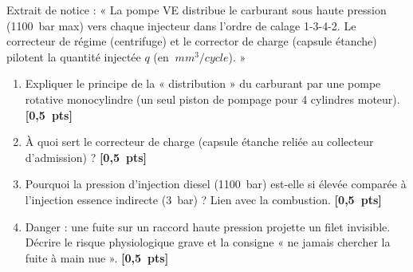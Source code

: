 \documentclass[11pt]{article}
\begin{document}
\begin{exercice}
Extrait de notice : « La pompe VE distribue le carburant sous haute pression (\SI{1100}{bar} max) vers chaque injecteur dans l'ordre de calage 1-3-4-2. Le correcteur de régime (centrifuge) et le corrector de charge (capsule étanche) pilotent la quantité injectée $q$ (en $\SI{}{mm^3/cycle}$). »
\begin{enumerate}
    \item Expliquer le principe de la « distribution » du carburant par une pompe rotative monocylindre (un seul piston de pompage pour 4 cylindres moteur). \hfill\textbf{[0,5~pts]}
    \item À quoi sert le correcteur de charge (capsule étanche reliée au collecteur d'admission) ? \hfill\textbf{[0,5~pts]}
    \item Pourquoi la pression d'injection diesel (\SI{1100}{bar}) est-elle si élevée comparée à l'injection essence indirecte (\SI{3}{bar}) ? Lien avec la combustion. \hfill\textbf{[0,5~pts]}
    \item Danger : une fuite sur un raccord haute pression projette un filet invisible. Décrire le risque physiologique grave et la consigne « ne jamais chercher la fuite à main nue ». \hfill\textbf{[0,5~pts]}
\end{enumerate}
\end{exercice}
\end{document}
